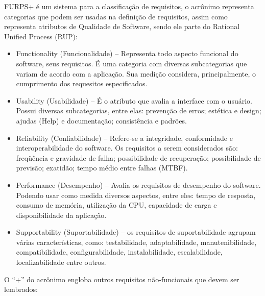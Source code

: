   FURPS+ é um sistema para a classificação de requisitos, o acrônimo representa categorias que podem ser usadas na definição de requisitos, assim como representa atributos de Qualidade de Software, sendo ele parte do Rational Unified Process (RUP):
\begin{itemize}

\item Functionality (Funcionalidade) – Representa todo aspecto funcional do software, seus requisitos. É uma categoria com diversas subcategorias que variam de acordo com a aplicação. Sua medição considera, principalmente, o cumprimento dos requesitos especificados.

\item Usability (Usabilidade) – É o atributo que avalia a interface com o usuário. Possui diversas subcategorias, entre elas: prevenção de erros; estética e design; ajudas (Help) e documentação; consistência e padrões.

\item Reliability (Confiabilidade) – Refere-se a integridade, conformidade e interoperabilidade do software. Os requisitos a serem considerados são: freqüência e gravidade de falha; possibilidade de recuperação; possibilidade de previsão; exatidão; tempo médio entre falhas (MTBF).

\item Performance (Desempenho) – Avalia os requisitos de desempenho do software. Podendo usar como medida diversos aspectos, entre eles: tempo de resposta, consumo de memória, utilização da CPU, capacidade de carga e disponibilidade da aplicação.

\item Supportability (Suportabilidade) – os requisitos de suportabilidade agrupam várias características, como: testabilidade, adaptabilidade, manutenibilidade, compatibilidade, configurabilidade, instalabilidade, escalabilidade, localizabilidade entre outros.
\end{itemize}
O “+” do acrônimo engloba outros requisitos não-funcionais que devem ser lembrados:
